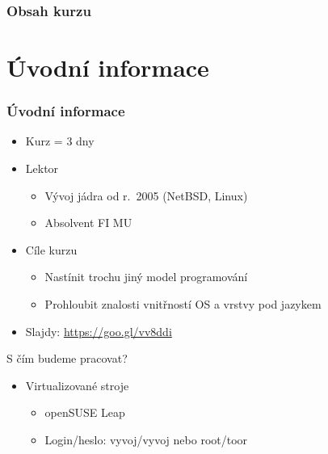 


\usepackage{pifont}
\newcommand{\cmark}{\ding{51}}
\newcommand{\xmark}{\ding{55}}
\newcommand{\ant}{\textsc{Antlr}\xspace}

\date{11--13. 9. \the\year}

\pbbintrue



\frame{\titlepage}


\setcounter{tocdepth}{1}
\begin{frame}
  \frametitle{Obsah kurzu}
  \tableofcontents
\end{frame}
\setcounter{tocdepth}{3}

\section{Úvodní informace}
\frame{\sectionpage}

\begin{frame}
  \frametitle{Úvodní informace}
  \begin{itemize}
    \item Kurz = 3 dny

    \pause

    \item Lektor
    \begin{itemize}
      \item Vývoj jádra od r.\ 2005 (NetBSD, Linux)
      \item Absolvent FI MU
    \end{itemize}

    \pause

    \item Cíle kurzu
    \begin{itemize}
      \item Nastínit trochu jiný model programování
      \item Prohloubit znalosti vnitřností OS a vrstvy pod jazykem
    \end{itemize}

    \pause

    \item Slajdy: \url{https://goo.gl/vv8ddi}

  \end{itemize}

\end{frame}

\begin{frame}{S čím budeme pracovat?}

  \begin{itemize}
    \item Virtualizované stroje
    \begin{itemize}
      \item openSUSE Leap
      \item Login/heslo: vyvoj/vyvoj nebo root/toor
    \end{itemize}
  \end{itemize}

\end{frame}

